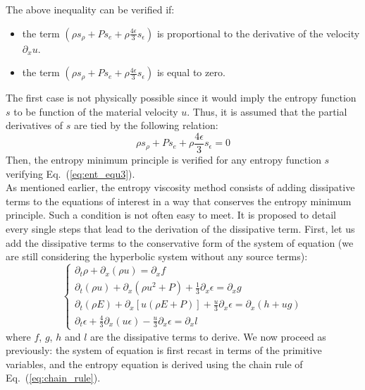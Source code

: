 \documentclass{article}
\newcommand{\eqt}[1]{Eq.~(\ref{#1})}                     %
\begin{document}
The above inequality can be verified if:
\begin{itemize}
\item the term $\left( \rho s_{\rho} + P s_e +\rho  \frac{4\epsilon}{3} s_{\epsilon} \right)$ is proportional to the derivative of the velocity $\partial_x u$.
\item the term $\left( \rho s_{\rho} + P s_e + \rho \frac{4\epsilon}{3} s_{\epsilon} \right)$ is equal to zero. 
\end{itemize}
The first case is not physically possible since it would imply the entropy function $s$ to be function of the material velocity $u$. Thus, it is assumed that the partial derivatives of $s$ are tied by the following relation:
\begin{equation}
\label{eq:ent_equ3}
 \rho s_{\rho} + P s_e + \rho \frac{4\epsilon}{3} s_{\epsilon} = 0
\end{equation}
Then, the entropy minimum principle is verified for any entropy function $s$ verifying \eqt{eq:ent_equ3}. \\
As mentioned earlier, the entropy viscosity method consists of adding dissipative terms to the equations of interest in a way that conserves the entropy minimum principle. Such a condition is not often easy to meet. It is proposed to detail every single steps that lead to the derivation of the dissipative term. First, let us add the dissipative terms to the conservative form of the system of equation (we are still considering the hyperbolic system without any source terms):
\begin{equation}
\label{eq:radhydro4}
\left\{
\begin{array}{llll}
\partial_t \rho + \partial_x \left( \rho u \right) = \partial_x f\\
\partial_t \left( \rho u \right) + \partial_x \left( \rho u^2 + P \right) + \frac{1}{3} \partial_x \epsilon = \partial_x g\\
\partial_t \left( \rho E \right) + \partial_x \left[ u \left(\rho E + P \right) \right]  +  \frac{u}{3} \partial_x \epsilon = \partial_x \left( h + ug \right)\\
\partial_t \epsilon + \frac{4}{3} \partial_x \left( u \epsilon  \right) - \frac{u}{3} \partial_x \epsilon = \partial_x l 
\end{array}
\right.
\end{equation}
where $f$, $g$, $h$ and $l$ are the dissipative terms to derive. We now proceed as previously: the system of equation is first recast in terms of the primitive variables, and the entropy equation is derived using the chain rule of \eqt{eq:chain_rule}. \\
\end{document}
